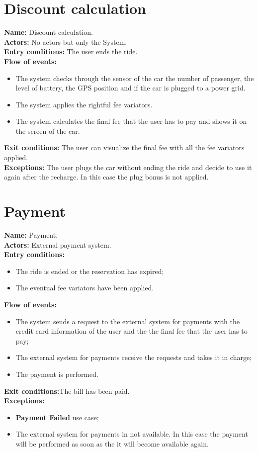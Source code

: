 \section*{Discount calculation}
\textbf{Name:} Discount calculation.\\
\textbf{Actors:} No actors but only the System.\\
\textbf{Entry conditions:} The user ends the ride.\\
\textbf{Flow of events:}
\begin{itemize}
\item The system checks through the sensor of the car the number of passenger, the level of battery, the GPS position and if the car is plugged to a power grid.
\item The system applies the rightful fee variators.
\item The system calculates the final fee that the user has to pay and shows it on the screen of the car.
\end{itemize}
\textbf{Exit conditions:} The user can visualize the final fee with all the fee variators applied.\\
\textbf{Exceptions:} The user plugs the car without ending the ride and decide to use it again after the recharge. In this case the plug bonus is not applied.

\section*{Payment}
\textbf{Name:} Payment.\\
\textbf{Actors:} External payment system.\\
\textbf{Entry conditions:}
\begin{itemize}
\item The ride is ended or the reservation has expired;
\item The eventual fee variators have been applied.
\end{itemize}
\textbf{Flow of events:}
\begin{itemize}
\item The system sends a request to the external system for payments with the credit card information of the user and the the final fee that the user has to pay;
\item The external system for payments receive the requests and takes it in charge;
\item The payment is performed.
\end{itemize}
\textbf{Exit conditions:}The bill has been paid.\\
\textbf{Exceptions:}
\begin{itemize}
\item\textbf{Payment Failed} use case;
\item The external system for payments in not available. In this case the payment will be performed as soon as the it will become available again.
\end{itemize}

